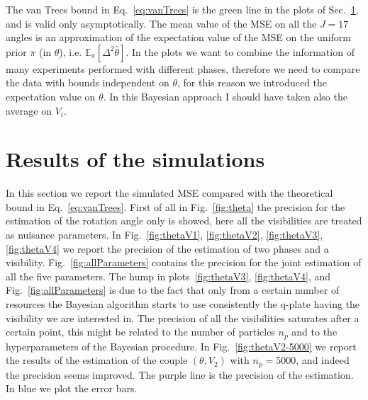 \documentclass[aps, pra, 10pt, twocolumn, superscriptaddress,floatfix]{revtex4-1}
\begin{document}
%
The van Trees bound in Eq.~\eqref{eq:vanTrees} is the green line in the plots of Sec.~\ref{sec:results}, and is valid only asymptotically. The mean value of the MSE on all the $J=17$ angles is an approximation of the expectation value of the MSE on the uniform prior $\pi$ (in $\theta$), i.e. $\mathbb{E}_\pi [\Delta^2 \hat{\theta} ]$. In the plots we want to combine the information of many experiments performed with different phases, therefore we need to compare the data with bounds independent on $\theta$, for this reason we introduced the expectation value on $\theta$. {\color{red} In this Bayesian approach I should have taken also the average on $V_i$.}


\section{Results of the simulations}
\label{sec:results}
%
In this section we report the simulated MSE compared with the theoretical bound in Eq.~\eqref{eq:vanTrees}. First of all in Fig.~\ref{fig:theta} the precision for the estimation of the rotation angle only is showed, here all the visibilities are treated as nuisance parameters. In Fig.~\ref{fig:thetaV1}, \ref{fig:thetaV2}, \ref{fig:thetaV3}, \ref{fig:thetaV4} we report the precision of the estimation of two phases and a visibility.
Fig.~\ref{fig:allParameters} contains the precision for the joint estimation of all the five parameters. The hump in plots~\ref{fig:thetaV3}, \ref{fig:thetaV4}, and Fig.~\ref{fig:allParameters} is due to the fact that only from a certain number of resources the Bayesian algorithm starts to use consistently the q-plate having the visibility we are interested in. 
The precision of all the visibilities saturates after a certain point, this might be related to the number of particles $n_p$ and to the hyperparameters of the Bayesian procedure. In Fig.~\ref{fig:thetaV2-5000} we report the results of the estimation of the couple $(\theta, V_2)$ with $n_p = 5000$, and indeed the precision seems improved. The purple line is the precision of the estimation. In blue we plot the error bars.
\end{document}
